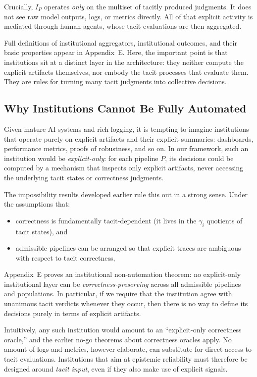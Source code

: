 \documentclass[11pt]{article}
\theoremstyle{definition}
\begin{document}
Crucially, $I_P$ operates \emph{only} on the multiset of tacitly produced judgments. It does not see raw model outputs, logs, or metrics directly. All of that explicit activity is mediated through human agents, whose tacit evaluations are then aggregated.

Full definitions of institutional aggregators, institutional outcomes, and their basic properties appear in Appendix~E. Here, the important point is that institutions sit at a distinct layer in the architecture: they neither compute the explicit artifacts themselves, nor embody the tacit processes that evaluate them. They are rules for turning many tacit judgments into collective decisions.

\subsection{Why Institutions Cannot Be Fully Automated}

Given mature AI systems and rich logging, it is tempting to imagine institutions that operate purely on explicit artifacts and their explicit summaries: dashboards, performance metrics, proofs of robustness, and so on. In our framework, such an institution would be \emph{explicit-only}: for each pipeline $P$, its decisions could be computed by a mechanism that inspects only explicit artifacts, never accessing the underlying tacit states or correctness judgments.

The impossibility results developed earlier rule this out in a strong sense. Under the assumptions that:
\begin{itemize}
  \item correctness is fundamentally tacit-dependent (it lives in the $\gamma_i$ quotients of tacit states), and
  \item admissible pipelines can be arranged so that explicit traces are ambiguous with respect to tacit correctness,
\end{itemize}
Appendix~E proves an institutional non-automation theorem: no explicit-only institutional layer can be \emph{correctness-preserving} across all admissible pipelines and populations. In particular, if we require that the institution agree with unanimous tacit verdicts whenever they occur, then there is no way to define its decisions purely in terms of explicit artifacts.

Intuitively, any such institution would amount to an ``explicit-only correctness oracle,'' and the earlier no-go theorems about correctness oracles apply. No amount of logs and metrics, however elaborate, can substitute for direct access to tacit evaluations. Institutions that aim at epistemic reliability must therefore be designed around \emph{tacit input}, even if they also make use of explicit signals.
\end{document}
